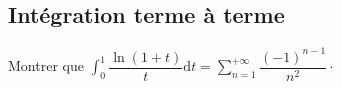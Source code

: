 \documentclass[a4paper,twoside,french,11pt]{VcCours}
\newcommand{\dt}{\text{d}t}
\begin{document}

\subsection{Intégration terme à terme}


\begin{Exercice}{} Montrer que $\int_{0}^1 \dfrac{\ln(1+t)}{t}\dt = \sum_{n=1}^{+ \infty} \dfrac{(-1)^{n-1}}{n^2} \cdot$
\end{Exercice}
\end{document}
